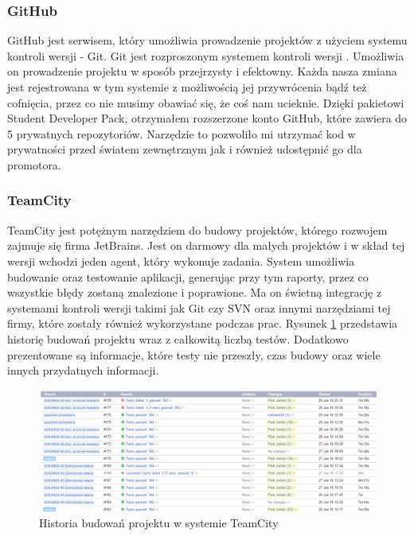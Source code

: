 \subsubsection{GitHub}
GitHub jest serwisem, który umożliwia prowadzenie projektów z użyciem systemu kontroli wersji - Git. Git jest rozproszonym systemem kontroli wersji \cite{GIT}. Umożliwia on prowadzenie projektu w sposób przejrzysty i efektowny. Każda nasza zmiana jest rejestrowana w tym systemie z możliwością jej przywrócenia bądź też cofnięcia, przez co nie musimy obawiać się, że coś nam ucieknie. Dzięki pakietowi Student Developer Pack, otrzymałem rozszerzone konto GitHub, które zawiera do 5 prywatnych repozytoriów. Narzędzie to pozwoliło mi utrzymać kod w prywatności przed światem zewnętrznym jak i również udostępnić go dla promotora.


\subsubsection{TeamCity}
TeamCity jest potężnym narzędziem do budowy projektów, którego rozwojem zajmuje się firma JetBrains. Jest on darmowy dla małych projektów i w skład tej wersji wchodzi jeden agent, który wykonuje zadania. System umożliwia budowanie oraz testowanie aplikacji, generując przy tym raporty, przez co wszystkie błędy zostaną znalezione i poprawione. Ma on świetną integrację z systemami kontroli wersji takimi jak Git czy SVN oraz innymi narzędziami tej firmy, które zostały również wykorzystane podczas prac. Rysunek \ref{fig:teamcity} przedstawia historię budowań projektu wraz z całkowitą liczbą testów. Dodatkowo prezentowane są informacje, które testy nie przeszły, czas budowy oraz wiele innych przydatnych informacji.

\begin{figure}[h!]
	\centering
	\includegraphics[width=15cm]{rysunki/screenshot_teamcity.png}	
	\caption{Historia budowań projektu w systemie TeamCity}
	\label{fig:teamcity}
\end{figure}


